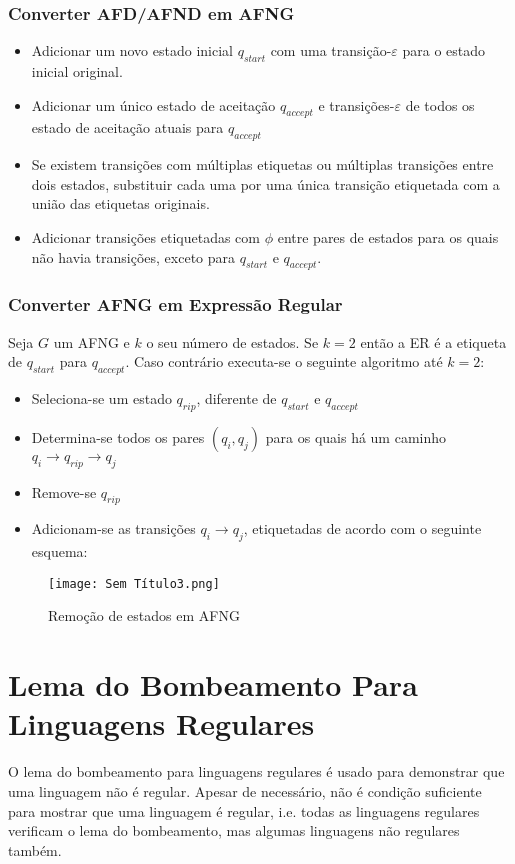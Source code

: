 \documentclass[10pt,a4paper]{report}
\begin{document}
\subsubsection{Converter AFD/AFND em AFNG}
\begin{itemize}
\item Adicionar um novo estado inicial $q_{start}$ com uma transição-$\varepsilon$ para o estado inicial original.
\item Adicionar um único estado de aceitação $q_{accept}$ e transições-$\varepsilon$ de todos os estado de aceitação atuais para $q_{accept}$
\item Se existem transições com múltiplas etiquetas ou múltiplas transições entre dois estados, substituir cada uma por uma única transição etiquetada com a união das etiquetas originais.
\item Adicionar transições etiquetadas com $\phi$ entre pares de estados para os
quais não havia transições, exceto para $q_{start}$ e $q_{accept}$.
\end{itemize}
\subsubsection{Converter AFNG em Expressão Regular}
Seja $G$ um AFNG e $k$ o seu número de estados. Se $k = 2$ então a ER é a etiqueta de $q_{start}$ para $q_{accept}$. Caso contrário executa-se o seguinte algoritmo até $k = 2$:
\begin{itemize}
\item Seleciona-se um estado $q_{rip}$, diferente de $q_{start}$ e $q_{accept}$
\item Determina-se todos os pares $(q_i,q_j)$ para os quais há um caminho $q_i \rightarrow q_{rip} \rightarrow q_j$
\item Remove-se $q_{rip}$
\item Adicionam-se as transições $q_i \rightarrow q_j$, etiquetadas de acordo com o seguinte esquema:
\end{itemize}
\begin{figure}[H]
\centering
\texttt{[image: Sem Título3.png]}
\caption{Remoção de estados em AFNG}
\end{figure}

\section{Lema do Bombeamento Para Linguagens Regulares}
O lema do bombeamento para linguagens regulares é usado para demonstrar que uma linguagem não é regular. Apesar de necessário, não é condição suficiente para mostrar que uma linguagem é regular, i.e. todas as linguagens regulares verificam o lema do bombeamento, mas algumas linguagens não regulares também.
\end{document}
